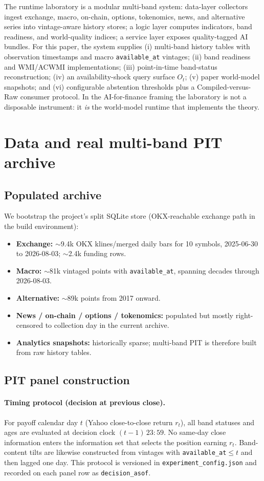 \documentclass[12pt]{article}
\begin{document}
The runtime laboratory is a modular multi-band system: data-layer collectors ingest exchange, macro, on-chain, options, tokenomics, news, and alternative series into vintage-aware history stores; a logic layer computes indicators, band readiness, and world-quality indices; a service layer exposes quality-tagged AI bundles. For this paper, the system supplies (i) multi-band history tables with observation timestamps and macro \texttt{available\_at} vintages; (ii) band readiness and WMI/ACWMI implementations; (iii) point-in-time band-status reconstruction; (iv) an availability-shock query surface $O_t$; (v) paper world-model snapshots; and (vi) configurable abstention thresholds plus a Compiled-versus-Raw consumer protocol. In the AI-for-finance framing the laboratory is not a disposable instrument: it \emph{is} the world-model runtime that implements the theory.

\section{Data and real multi-band PIT archive}
\label{sec:data}

\subsection{Populated archive}
We bootstrap the project's split SQLite store (OKX-reachable exchange path in the build environment):
\begin{itemize}[leftmargin=1.4em]
\item \textbf{Exchange:} $\sim$9.4k OKX klines/merged daily bars for 10 symbols, 2025-06-30 to 2026-08-03; $\sim$2.4k funding rows.
\item \textbf{Macro:} $\sim$81k vintaged points with \texttt{available\_at}, spanning decades through 2026-08-03.
\item \textbf{Alternative:} $\sim$89k points from 2017 onward.
\item \textbf{News / on-chain / options / tokenomics:} populated but mostly right-censored to collection day in the current archive.
\item \textbf{Analytics snapshots:} historically sparse; multi-band PIT is therefore built from raw history tables.
\end{itemize}

\subsection{PIT panel construction}
\paragraph{Timing protocol (decision at previous close).}
For payoff calendar day $t$ (Yahoo close-to-close return $r_t$), all band statuses and ages are evaluated at decision clock $(t-1)\,23{:}59$. No same-day close information enters the information set that selects the position earning $r_t$. Band-content tilts are likewise constructed from vintages with \texttt{available\_at}$\le t$ and then lagged one day. This protocol is versioned in \texttt{experiment\_config.json} and recorded on each panel row as \texttt{decision\_asof}.
\end{document}
